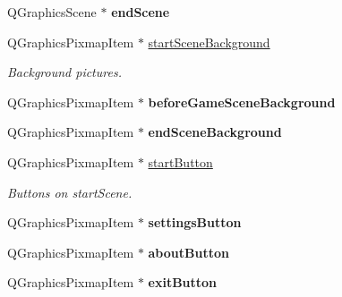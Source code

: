\begin{DoxyCompactItemize}
\item 
Q\+Graphics\+Scene $\ast$ {\bfseries end\+Scene}\hypertarget{class_game_menu_a235b359eff5bab01a8ca9d2b75466af1}{}\label{class_game_menu_a235b359eff5bab01a8ca9d2b75466af1}

\item 
Q\+Graphics\+Pixmap\+Item $\ast$ \hyperlink{class_game_menu_ab6fd3496d0426f663e9893a893764fcf}{start\+Scene\+Background}\hypertarget{class_game_menu_ab6fd3496d0426f663e9893a893764fcf}{}\label{class_game_menu_ab6fd3496d0426f663e9893a893764fcf}

\begin{DoxyCompactList}\small\item\em Background pictures. \end{DoxyCompactList}\item 
Q\+Graphics\+Pixmap\+Item $\ast$ {\bfseries before\+Game\+Scene\+Background}\hypertarget{class_game_menu_a59aa0e84b5d4db53a62bb52480856c25}{}\label{class_game_menu_a59aa0e84b5d4db53a62bb52480856c25}

\item 
Q\+Graphics\+Pixmap\+Item $\ast$ {\bfseries end\+Scene\+Background}\hypertarget{class_game_menu_a32c0e1b35559b840ffc5628cb59c8639}{}\label{class_game_menu_a32c0e1b35559b840ffc5628cb59c8639}

\item 
Q\+Graphics\+Pixmap\+Item $\ast$ \hyperlink{class_game_menu_a22c3e73fc24f9699e6a9f4bc1d6fbd52}{start\+Button}\hypertarget{class_game_menu_a22c3e73fc24f9699e6a9f4bc1d6fbd52}{}\label{class_game_menu_a22c3e73fc24f9699e6a9f4bc1d6fbd52}

\begin{DoxyCompactList}\small\item\em Buttons on start\+Scene. \end{DoxyCompactList}\item 
Q\+Graphics\+Pixmap\+Item $\ast$ {\bfseries settings\+Button}\hypertarget{class_game_menu_aca49d1e3a9dfec037cbc85a01cb6df82}{}\label{class_game_menu_aca49d1e3a9dfec037cbc85a01cb6df82}

\item 
Q\+Graphics\+Pixmap\+Item $\ast$ {\bfseries about\+Button}\hypertarget{class_game_menu_a3d6ca189f02e14ed5cfb5451526a271b}{}\label{class_game_menu_a3d6ca189f02e14ed5cfb5451526a271b}

\item 
Q\+Graphics\+Pixmap\+Item $\ast$ {\bfseries exit\+Button}\hypertarget{class_game_menu_a76bcbc6a772fb628f39140c9365eccd8}{}\label{class_game_menu_a76bcbc6a772fb628f39140c9365eccd8}


\end{DoxyCompactItemize}
